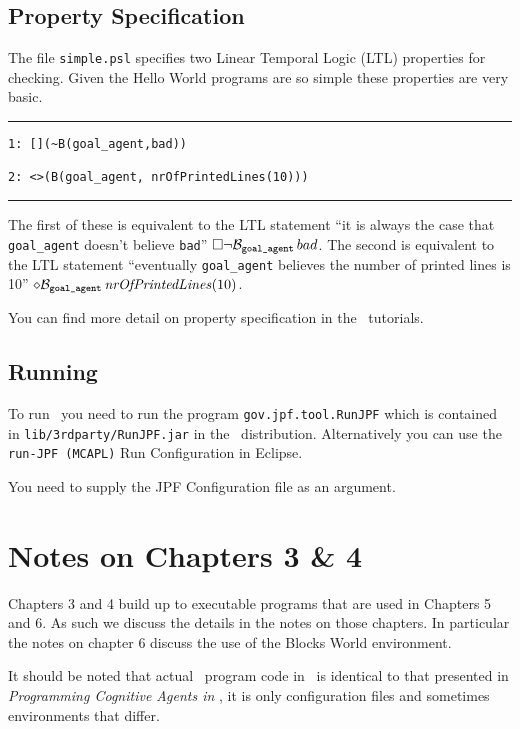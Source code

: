 \documentclass[a4]{article}
\begin{document}
\subsection{Property Specification}
The file \texttt{simple.psl} specifies two Linear Temporal Logic (LTL) properties for checking.  Given the Hello World programs are so simple these properties are very basic.  

\noindent\rule{\textwidth}{1pt}
\begin{small}
\begin{verbatim}
1: [](~B(goal_agent,bad))

2: <>(B(goal_agent, nrOfPrintedLines(10)))
\end{verbatim}
\end{small}
\rule{\textwidth}{1pt}

The first of these is equivalent to the LTL statement ``it is always the case that \texttt{goal\_agent} doesn't believe \texttt{bad}'' $\Box \neg \mathrm{{\cal B}}_{\texttt{goal\_agent}} \, bad$.  The second is equivalent to the LTL statement ``eventually \texttt{goal\_agent} believes the number of printed lines is 10'' $\diamond \mathrm{{\cal B}}_{\texttt{goal\_agent}} \, \mathit{nrOfPrintedLines}(10)$.

You can find more detail on property specification in the \ajpf\ tutorials.

\subsection{Running \ajpf}
To run \ajpf\ you need to run the program \texttt{gov.jpf.tool.RunJPF} which is contained in \texttt{lib/3rdparty/RunJPF.jar} in the \mcapl\ distribution.  Alternatively you can use the \texttt{run-JPF (MCAPL)} Run Configuration in Eclipse.

You need to supply the JPF Configuration file as an argument.  

\section{Notes on Chapters 3 \& 4}

Chapters 3 and 4 build up to executable programs that are used in Chapters 5 and 6.  As such we discuss the details in the notes on those chapters.  In particular the notes on chapter 6 discuss the use of the Blocks World environment.

It should be noted that actual \goal\ program code in \ail\ is identical to that presented in \emph{Programming Cognitive Agents in \goal}, it is only configuration files and sometimes environments that differ.
\end{document}
